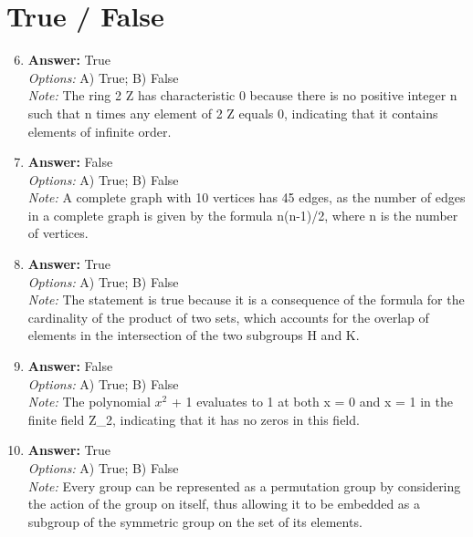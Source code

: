 \documentclass[12pt]{article}
\begin{document}
\section*{True / False}
\begin{enumerate}[label=\arabic*.]
\setcounter{enumi}{5}
\item \textbf{Answer:} True
\\ \textit{Options:} A) True; B) False
\\ \textit{Note:} The ring 2 Z has characteristic 0 because there is no positive integer n such that n times any element of 2 Z equals 0, indicating that it contains elements of infinite order.
\item \textbf{Answer:} False
\\ \textit{Options:} A) True; B) False
\\ \textit{Note:} A complete graph with 10 vertices has 45 edges, as the number of edges in a complete graph is given by the formula n(n-1)/2, where n is the number of vertices.
\item \textbf{Answer:} True
\\ \textit{Options:} A) True; B) False
\\ \textit{Note:} The statement is true because it is a consequence of the formula for the cardinality of the product of two sets, which accounts for the overlap of elements in the intersection of the two subgroups H and K.
\item \textbf{Answer:} False
\\ \textit{Options:} A) True; B) False
\\ \textit{Note:} The polynomial $x^2$ + 1 evaluates to 1 at both x = 0 and x = 1 in the finite field Z\_2, indicating that it has no zeros in this field.
\item \textbf{Answer:} True
\\ \textit{Options:} A) True; B) False
\\ \textit{Note:} Every group can be represented as a permutation group by considering the action of the group on itself, thus allowing it to be embedded as a subgroup of the symmetric group on the set of its elements.
\end{enumerate}
\end{document}
